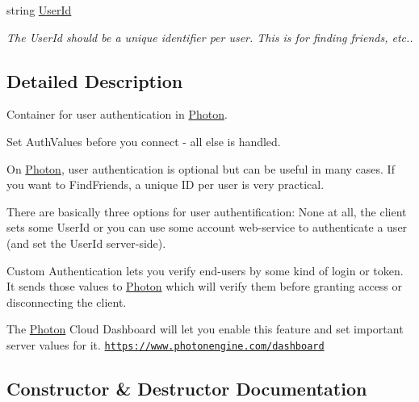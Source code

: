 \begin{DoxyCompactItemize}
string \hyperlink{class_exit_games_1_1_client_1_1_photon_1_1_chat_1_1_authentication_values_abe4f64001e4651f97f688a44992caa3b}{User\+Id}
\begin{DoxyCompactList}\small\item\em The User\+Id should be a unique identifier per user. This is for finding friends, etc..\end{DoxyCompactList}\end{DoxyCompactItemize}


\subsection{Detailed Description}
Container for user authentication in \hyperlink{namespace_exit_games_1_1_client_1_1_photon}{Photon}. 

Set Auth\+Values before you connect -\/ all else is handled. 

On \hyperlink{namespace_exit_games_1_1_client_1_1_photon}{Photon}, user authentication is optional but can be useful in many cases. If you want to Find\+Friends, a unique ID per user is very practical.

There are basically three options for user authentification\+: None at all, the client sets some User\+Id or you can use some account web-\/service to authenticate a user (and set the User\+Id server-\/side).

Custom Authentication lets you verify end-\/users by some kind of login or token. It sends those values to \hyperlink{namespace_exit_games_1_1_client_1_1_photon}{Photon} which will verify them before granting access or disconnecting the client.

The \hyperlink{namespace_exit_games_1_1_client_1_1_photon}{Photon} Cloud Dashboard will let you enable this feature and set important server values for it. \href{https://www.photonengine.com/dashboard}{\tt https\+://www.\+photonengine.\+com/dashboard} 

\subsection{Constructor \& Destructor Documentation}
